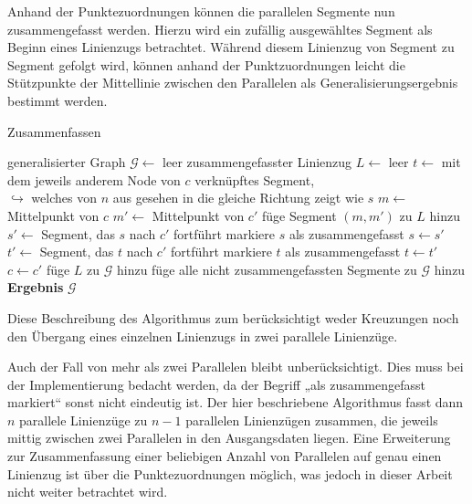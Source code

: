 \documentclass[../main/thesis.tex]{subfiles}
\begin{document}
Anhand der Punktezuordnungen können die parallelen Segmente nun zusammengefasst werden.
Hierzu wird ein zufällig ausgewähltes Segment als Beginn eines Linienzugs betrachtet.
Während diesem Linienzug von Segment zu Segment gefolgt wird, können anhand der Punktzuordnungen leicht die Stützpunkte der Mittellinie zwischen den Parallelen als Generalisierungsergebnis bestimmt werden.

\begin{algorithmhere}{Zusammenfassen}
\label{alg:Zusammenfassen}
\begin{algorithmic}
	\State generalisierter Graph $\mathcal{G} \gets$ leer
			\State zusammengefasster Linienzug $L \gets$ leer
			\State $t \gets$ mit dem jeweils anderem Node von $c$ verknüpftes Segment,\\\qquad\qquad\qquad\quad$\hookrightarrow$ welches von $n$ aus gesehen in die gleiche Richtung zeigt wie $s$
				\State $m \gets$ Mittelpunkt von $c$
				\State $m' \gets$ Mittelpunkt von $c'$
				\State füge Segment $(m, m')$ zu $L$ hinzu
				\State $s' \gets$ Segment, das $s$ nach $c'$ fortführt
					\State markiere $s$ als zusammengefasst
					\State $s \gets s'$
				\EndIf
				\State $t' \gets$ Segment, das $t$ nach $c'$ fortführt
					\State markiere $t$ als zusammengefasst
					\State $t \gets t'$
				\EndIf
				\State $c \gets c'$
			\EndWhile
			\State füge $L$ zu $\mathcal{G}$ hinzu
		\EndFor
	\EndFor
	\State füge alle nicht zusammengefassten Segmente zu $\mathcal{G}$ hinzu
	\State \textbf{Ergebnis} $\mathcal{G}$
\EndFunction
\end{algorithmic}
\end{algorithmhere}

Diese Beschreibung des Algorithmus zum  berücksichtigt
weder Kreuzungen noch den Übergang eines einzelnen Linienzugs in zwei parallele Linienzüge.

Auch der Fall von mehr als zwei Parallelen bleibt unberücksichtigt.
Dies muss bei der Implementierung bedacht werden, da der Begriff „als zusammengefasst markiert“ sonst nicht eindeutig ist.
Der hier beschriebene Algorithmus fasst dann $n$ parallele Linienzüge zu $n-1$ parallelen Linienzügen zusammen, die jeweils mittig zwischen zwei Parallelen in den Ausgangsdaten liegen.
Eine Erweiterung zur Zusammenfassung einer beliebigen Anzahl von Parallelen auf genau einen Linienzug ist über die Punktezuordnungen möglich, was jedoch in dieser Arbeit nicht weiter betrachtet wird.
\end{document}
